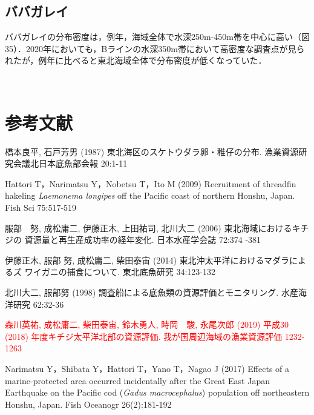 \documentclass[11pt]{article} %
\begin{document}
\begin{linenumbers}

\subsection{ババガレイ}
ババガレイの分布密度は，例年，海域全体で水深250m-450m帯を中心に高い（図35）．2020年においても，Bラインの水深350m帯において高密度な調査点が見られたが，例年に比べると東北海域全体で分布密度が低くなっていた．


\ \ \ \ \ \ \ \ \ \ 
\section{参考文献}
\hangindent=30pt
\noindent
橋本良平, 石戸芳男 (1987) 東北海区のスケトウダラ卵・稚仔の分布. 漁業資源研究会議北日本底魚部会報 20:1-11

\hangindent=30pt
\noindent
Hattori T，Narimatsu Y，Nobetsu T，Ito M (2009) Recruitment of threadfin hakeling \textit{Laemonema longipes} off the Pacific coast of northern Honshu, Japan. Fish Sci 75:517-519

\hangindent=30pt
\noindent
服部　努, 成松庸二, 伊藤正木, 上田祐司, 北川大二 (2006) 東北海域におけるキチジの
資源量と再生産成功率の経年変化. 日本水産学会誌 72:374 -381

\hangindent=30pt
\noindent
伊藤正木, 服部 努, 成松庸二, 柴田泰宙 (2014) 東北沖太平洋におけるマダラによるズ
ワイガニの捕食について. 東北底魚研究 34:123-132

\hangindent=30pt
\noindent
北川大二, 服部努 (1998) 調査船による底魚類の資源評価とモニタリング. 水産海洋研究 62:32-36

\hangindent=30pt
\noindent
\textcolor{red}{森川英祐, 成松庸二, 柴田泰宙, 鈴木勇人, 時岡　駿, 永尾次郎 (2019) 平成30 (2018) 年度キチジ太平洋北部の資源評価. 我が国周辺海域の漁業資源評価 1232-1263}

\hangindent=30pt
\noindent
Narimatsu Y，Shibata Y，Hattori T，Yano T，Nagao J (2017) Effects of a marine-protected area occurred incidentally after the Great East Japan Earthquake on the Pacific cod (\textit{Gadus macrocephalus}) population off northeastern Honshu, Japan. Fish Oceanogr 26(2):181-192


\end{linenumbers}
\end{document}
